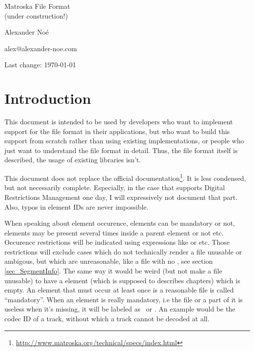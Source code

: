\documentclass[12pt]{article}
\begin{document}
\begin {center}
\Huge
\f{Matroska File Format \\ (under construction!)}

\end {center}
\begin{center}
Alexander Noé

alex@alexander-noe.com

Last change: \today
\end{center}

\setcounter{tocdepth}{2}
\tableofcontents
\label{listoftables}
\listoftables
\newpage
\Large
\setlength{\parskip}{2mm}
\section{Introduction}
\normalsize
This document is intended to be used by developers who want to implement support for the \Matroska file format in their applications, but who want to build this support from scratch rather than using existing implementations, or people who just want to understand the \Matroska file format in detail. Thus, the file format itself is described, the usage of existing libraries isn't.

This document does not replace the official documentation\footnote{\url{http://www.matroska.org/technical/specs/index.html}}. It is less condensed, but not necessarily complete. Especially, in the case that \Matroska supports Digital Restrictions Management one day, I will expressively not document that part. Also, typos in element IDs are never impossible.

When speaking about element occurence, elements can be mandatory or not, elements may be present several times inside a parent element or not etc. Occurence restrictions will be indicated using expressions like \occonce or \occmandatory etc. Those restrictions will exclude cases which do not technically render a file unusable or ambigous, but which are unreasonable, like a file with no , see section \ref{sec_SegmentInfo}. The same way it would be weird (but not make a file unusable) to have a  element (which is supposed to describes chapters) which is empty. An element that must occur at least once is a reasonable file is called ``mandatory''. When an element is really mandatory, i.e the file or a part of it is useless when it's missing, it will be labeled as \occverymandatory\ or \occveryonce. An example would be the codec ID of a track, without which a track cannot be decoded at all.
\end{document}
